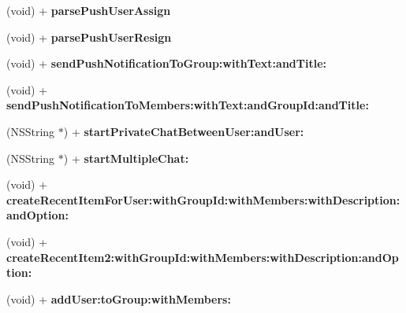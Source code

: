 \begin{DoxyCompactItemize}
\item 
\hypertarget{interface_e_s_utility_a2660b3ea1fc3b3f376889da0eee35dc4}{}(void) + {\bfseries parse\+Push\+User\+Assign}\label{interface_e_s_utility_a2660b3ea1fc3b3f376889da0eee35dc4}

\item 
\hypertarget{interface_e_s_utility_ae71ebe0d76d1e8d24aa42c045d2ccee9}{}(void) + {\bfseries parse\+Push\+User\+Resign}\label{interface_e_s_utility_ae71ebe0d76d1e8d24aa42c045d2ccee9}

\item 
\hypertarget{interface_e_s_utility_a99a07b1d3ad83d3b1d7e2762a34895c0}{}(void) + {\bfseries send\+Push\+Notification\+To\+Group\+:with\+Text\+:and\+Title\+:}\label{interface_e_s_utility_a99a07b1d3ad83d3b1d7e2762a34895c0}

\item 
\hypertarget{interface_e_s_utility_ad6197112d3247e563244b8ffcf578371}{}(void) + {\bfseries send\+Push\+Notification\+To\+Members\+:with\+Text\+:and\+Group\+Id\+:and\+Title\+:}\label{interface_e_s_utility_ad6197112d3247e563244b8ffcf578371}

\item 
\hypertarget{interface_e_s_utility_afb711308b2e0e979bac8c6e4f15b35ed}{}(N\+S\+String $\ast$) + {\bfseries start\+Private\+Chat\+Between\+User\+:and\+User\+:}\label{interface_e_s_utility_afb711308b2e0e979bac8c6e4f15b35ed}

\item 
\hypertarget{interface_e_s_utility_ae2f39125074a3fa016b1c66d54ed4ed6}{}(N\+S\+String $\ast$) + {\bfseries start\+Multiple\+Chat\+:}\label{interface_e_s_utility_ae2f39125074a3fa016b1c66d54ed4ed6}

\item 
\hypertarget{interface_e_s_utility_a4d611a05619fb7c4f6b271293509d75a}{}(void) + {\bfseries create\+Recent\+Item\+For\+User\+:with\+Group\+Id\+:with\+Members\+:with\+Description\+:and\+Option\+:}\label{interface_e_s_utility_a4d611a05619fb7c4f6b271293509d75a}

\item 
\hypertarget{interface_e_s_utility_a356cd69269c780a371e3aaebc3aa11b0}{}(void) + {\bfseries create\+Recent\+Item2\+:with\+Group\+Id\+:with\+Members\+:with\+Description\+:and\+Option\+:}\label{interface_e_s_utility_a356cd69269c780a371e3aaebc3aa11b0}

\item 
\hypertarget{interface_e_s_utility_a214eb4807537c2a9cd118829759b6a9e}{}(void) + {\bfseries add\+User\+:to\+Group\+:with\+Members\+:}\label{interface_e_s_utility_a214eb4807537c2a9cd118829759b6a9e}


\end{DoxyCompactItemize}
